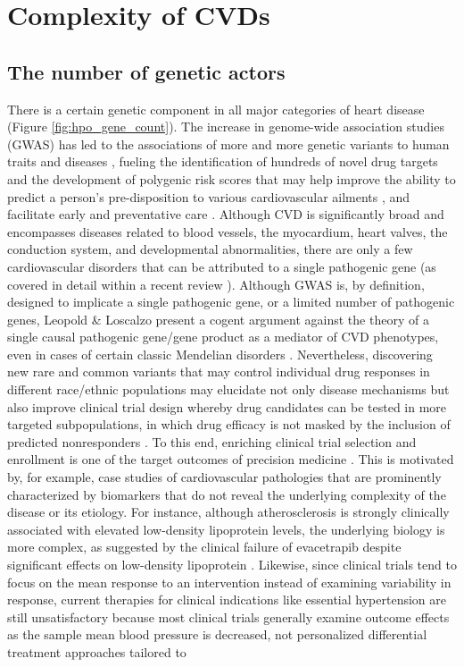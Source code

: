 \documentclass[letter]{bib}
\newcounter{example}[subsection]
\begin{document}
	\section*{Complexity of CVDs}  %
	\subsection*{The number of genetic actors}
	
There is a certain genetic component in all major categories of heart disease (Figure \ref{fig:hpo_gene_count}). The increase in genome-wide association studies (GWAS) has led to the associations of more and more genetic variants to human traits and diseases \citep{Visscher:2017:10}, fueling the identification of hundreds of novel drug targets and the development of polygenic risk scores that may help improve the ability to predict a person's pre-disposition to various cardiovascular ailments \citep{Ganna:2013:Multilocus,Goldstein:2014:Simple,Krarup:2015:genetic,Tada:2016:Risk,Abraham:2016:Genomic}, and facilitate early and preventative care \citep{Assimes:2016:Genetic}.  Although CVD is significantly broad and encompasses diseases related to blood vessels, the myocardium, heart valves, the conduction system, and developmental abnormalities, there are only a few cardiovascular disorders that can be attributed to a single pathogenic gene (as covered in detail within a recent review \citep{Leopold:2018:Emerging}).  Although GWAS is, by definition, designed to implicate a single pathogenic gene, or a limited number of pathogenic genes, Leopold \& Loscalzo present a cogent argument against the theory of a single causal pathogenic gene/gene product as a mediator of CVD phenotypes, even in cases of certain classic Mendelian disorders \citep{Leopold:2018:Emerging}.  Nevertheless, discovering new rare and common variants that may control individual drug responses in different race/ethnic populations may elucidate not only disease mechanisms but also improve clinical trial design whereby drug candidates can be tested in more targeted subpopulations, in which drug efficacy is not masked by the inclusion of predicted nonresponders \citep{Lau:2018:Omics}.  To this end, enriching clinical trial selection and enrollment is one of the target outcomes of precision medicine \citep{Leopold:2018:Emerging}.  This is motivated by, for example, case studies of cardiovascular pathologies that are prominently characterized by biomarkers that do not reveal the underlying complexity of the disease or its etiology. For instance, although atherosclerosis is strongly clinically associated with elevated low-density lipoprotein levels, the underlying biology is more complex, as suggested by the clinical failure of evacetrapib despite significant effects on low-density lipoprotein \citep{Johnson:2017:Enabling}.  Likewise, since clinical trials tend to focus on the mean response to an intervention instead of examining variability in response, current therapies for clinical indications like essential hypertension are still unsatisfactory because most clinical trials generally examine outcome effects as the sample mean blood pressure is decreased, not personalized differential treatment approaches tailored to 
\end{document}
